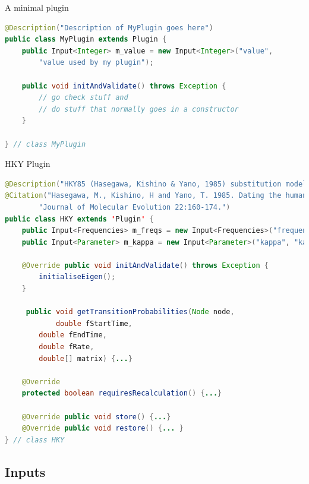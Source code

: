 \documentclass{beamer}
\theoremstyle{definition}
\begin{document}
\begin{frame}[containsverbatim]
{A minimal plugin}

{\color{blue}\begin{lstlisting}[language=java]
@Description("Description of MyPlugin goes here")
public class MyPlugin extends Plugin {
    public Input<Integer> m_value = new Input<Integer>("value",
        "value used by my plugin");

    public void initAndValidate() throws Exception {
        // go check stuff and 
        // do stuff that normally goes in a constructor
    }

} // class MyPlugin
\end{lstlisting}}
\end{frame}


\begin{frame}[containsverbatim]
{HKY Plugin}

{
\tiny
\begin{lstlisting}[language=java]
@Description("HKY85 (Hasegawa, Kishino & Yano, 1985) substitution model of nucleotide evolution.")
@Citation("Hasegawa, M., Kishino, H and Yano, T. 1985. Dating the human-ape splitting by a molecular clock of mitochondrial DNA. " +
        "Journal of Molecular Evolution 22:160-174.")
public class HKY extends 'Plugin' {
    public Input<Frequencies> m_freqs = new Input<Frequencies>("frequencies", "frequencies nucleotide letters");
    public Input<Parameter> m_kappa = new Input<Parameter>("kappa", "kappa parameter in HKY model", Validate.REQUIRED);

    @Override public void initAndValidate() throws Exception {
        initialiseEigen();        
    }

     public void getTransitionProbabilities(Node node, 
      		double fStartTime, 
		double fEndTime, 
		double fRate, 
		double[] matrix) {...}
 
    @Override
    protected boolean requiresRecalculation() {...}

    @Override public void store() {...}
    @Override public void restore() {... }
} // class HKY
\end{lstlisting}
}
\end{frame}

\subsection{Inputs}
\end{document}
